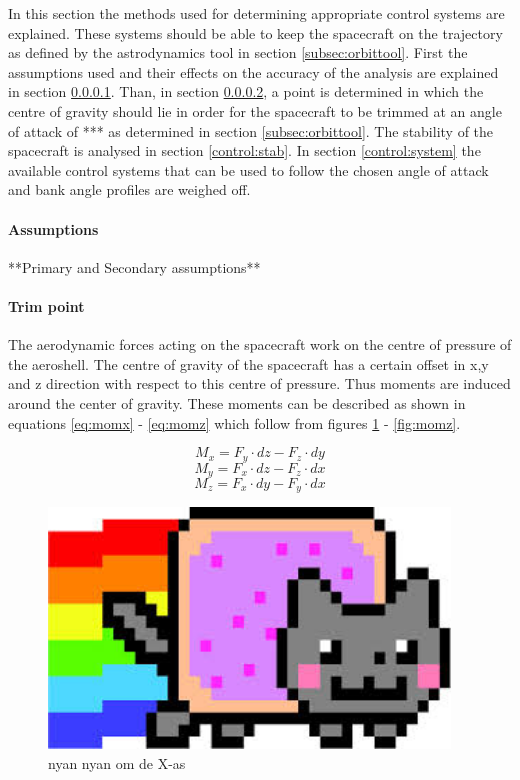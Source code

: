 In this section the methods used for determining appropriate control systems are explained. These systems should be able to keep the spacecraft on the trajectory as defined by the astrodynamics tool in section \ref{subsec:orbittool}. First the assumptions used and their effects on the accuracy of the analysis are explained in section \ref{control:assumptions}. Than, in section \ref{control:trim}, a point is determined in which the centre of gravity should lie in order for the spacecraft to be trimmed at an angle of attack of *** as determined in section  \ref{subsec:orbittool}. The stability of the spacecraft is analysed in section \ref{control:stab}. In section \ref{control:system} the available control systems that can be used to follow the chosen angle of attack and bank angle profiles are weighed off.

\paragraph{Assumptions}
\label{control:assumptions}
**Primary and Secondary assumptions**

\paragraph{Trim point}
\label{control:trim}
The aerodynamic forces acting on the spacecraft work on the centre of pressure of the aeroshell. The centre of gravity of the spacecraft has a certain offset in x,y and z direction with respect to this centre of pressure. Thus moments are induced around the center of gravity. These moments can be described as shown in equations \ref{eq:momx} - \ref{eq:momz} which follow from figures \ref{fig:momx} - \ref{fig:momz}.

\begin{equation}
\label{eq:momx}
M_x = F_y \cdot dz - F_z \cdot dy
\end{equation}
\begin{equation}
\label{eq:momy}
M_y = F_x \cdot dz - F_z \cdot dx
\end{equation}
\begin{equation}
\label{eq:momz}
M_z = F_x \cdot dy - F_y \cdot dx
\end{equation}

\begin{figure}
	\centering
	\includegraphics[width=0.95\textwidth]{./Figure/Nyan}
	\caption{nyan nyan om de X-as}
	\label{fig:momx}
\end{figure}

